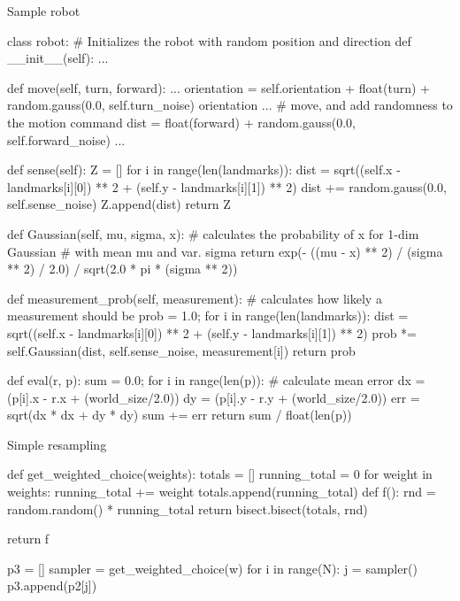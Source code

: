 \documentclass{report}
\begin{document}
\begin{algorithm}
\caption{Sample robot}
\label{ref:robotpython}
\begin{python}
class robot:
    # Initializes the robot with random position and direction
    def __init__(self):
        ...

    def move(self, turn, forward):
        ...
        orientation = self.orientation + float(turn) + random.gauss(0.0, self.turn_noise)
        orientation %
        ...
        # move, and add randomness to the motion command
        dist = float(forward) + random.gauss(0.0, self.forward_noise)
        ...

    def sense(self):
        Z = []
        for i in range(len(landmarks)):
            dist = sqrt((self.x - landmarks[i][0]) ** 2
                     + (self.y - landmarks[i][1]) ** 2)
            dist += random.gauss(0.0, self.sense_noise)
            Z.append(dist)
        return Z

    def Gaussian(self, mu, sigma, x):
        # calculates the probability of x for 1-dim Gaussian
        # with mean mu and var. sigma
        return exp(- ((mu - x) ** 2) / (sigma ** 2) / 2.0)
                     / sqrt(2.0 * pi * (sigma ** 2))

    def measurement_prob(self, measurement):
        # calculates how likely a measurement should be
        prob = 1.0;
        for i in range(len(landmarks)):
            dist = sqrt((self.x - landmarks[i][0]) ** 2
                     + (self.y - landmarks[i][1]) ** 2)
            prob *= self.Gaussian(dist, self.sense_noise,
                                 measurement[i])
        return prob

def eval(r, p):
    sum = 0.0;
    for i in range(len(p)): # calculate mean error
        dx = (p[i].x - r.x + (world_size/2.0)) %
        dy = (p[i].y - r.y + (world_size/2.0)) %
        err = sqrt(dx * dx + dy * dy)
        sum += err
    return sum / float(len(p))
\end{python}
\end{algorithm}


\begin{algorithm}
\caption{Simple resampling}
\label{alg:simpleresampling}
\begin{python}
def get_weighted_choice(weights):
    totals = []
    running_total = 0
    for weight in weights:
        running_total += weight
        totals.append(running_total)
    def f():
        rnd = random.random() * running_total
        return bisect.bisect(totals, rnd)

    return f

p3 = []
sampler = get_weighted_choice(w)
for i in range(N):
    j = sampler()
    p3.append(p2[j])
\end{python}
\end{algorithm}
\end{document}

